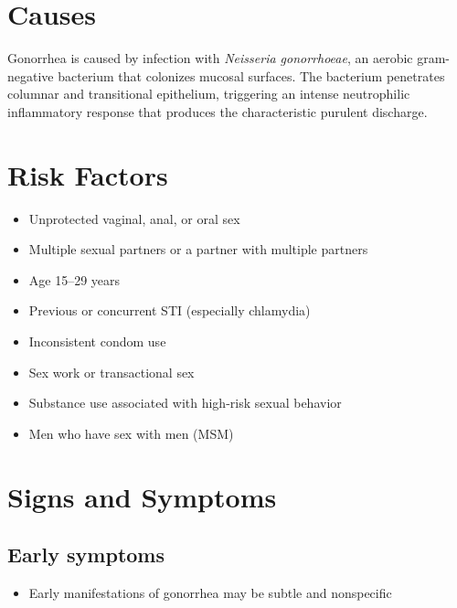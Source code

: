 \section{Causes}
Gonorrhea is caused by infection with \textit{Neisseria gonorrhoeae}, an aerobic gram-negative bacterium that colonizes mucosal surfaces. The bacterium penetrates columnar and transitional epithelium, triggering an intense neutrophilic inflammatory response that produces the characteristic purulent discharge.

\section{Risk Factors}

\begin{itemize}[noitemsep]
  \item Unprotected vaginal, anal, or oral sex
  \item Multiple sexual partners or a partner with multiple partners
  \item Age 15--29 years
  \item Previous or concurrent STI (especially chlamydia)
  \item Inconsistent condom use
  \item Sex work or transactional sex
  \item Substance use associated with high-risk sexual behavior
  \item Men who have sex with men (MSM)
\end{itemize}

\section{Signs and Symptoms}

\subsection{Early symptoms}
\begin{itemize}[noitemsep]
  \item Early manifestations of gonorrhea may be subtle and nonspecific
\end{itemize}

